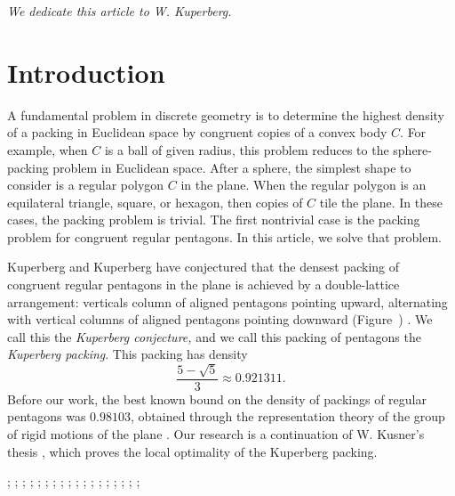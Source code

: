 \centerline{\it We dedicate this article to W. Kuperberg.}

\section{Introduction} %

A fundamental problem in discrete geometry is to determine the highest density of a packing
in Euclidean space by congruent copies of a convex body $C$.   For example, when $C$ is a ball
of given radius, this problem reduces to the sphere-packing problem in Euclidean space.
After a sphere, the simplest shape to consider is a regular polygon $C$ in the plane.
When the regular polygon is an equilateral triangle, square, or hexagon, then copies of $C$ tile
the plane.  In these cases, the packing problem is trivial.  The first nontrivial case
is the packing problem for congruent regular pentagons.  In this article, we solve that problem.

Kuperberg and Kuperberg
 have conjectured that the
densest packing of congruent regular pentagons in the plane is
achieved by a double-lattice arrangement: verticals column of aligned
pentagons pointing upward, alternating with vertical columns of
aligned pentagons pointing downward (Figure~) \cite{Kup}.  We call this the {\it Kuperberg
  conjecture,}  and we call this packing of pentagons the {\it Kuperberg packing}.
This packing has density
\[
\frac{5 - \sqrt{5}}3 \approx 0.921311.
\] %
Before our work, the best known bound on the density of packings of regular
pentagons was $0.98103$, obtained through the representation theory of the group of rigid motions of the plane \cite{Val}.
Our research is a continuation of W. Kusner's thesis \cite{Kus}, which proves
the local optimality of the Kuperberg packing.


{
;  %
;  %
;  
;  %
; 
;  
;  
;  %
; 
;  
;  
;  %
;  %
; 
;  %
; 
;  
;   
}


